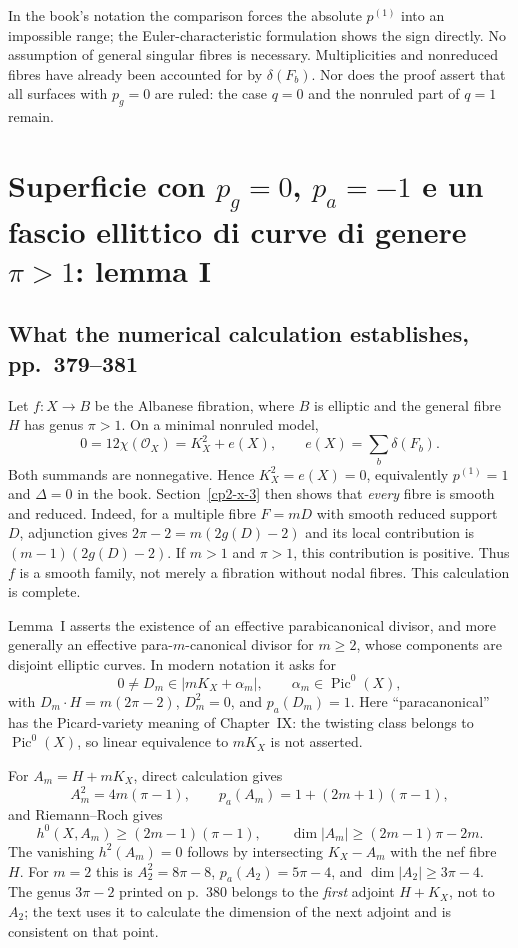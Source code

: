 In the book's notation the comparison forces the absolute $p^{(1)}$ into an impossible range; the Euler-characteristic formulation shows the sign directly. No assumption of general singular fibres is necessary. Multiplicities and nonreduced fibres have already been accounted for by $\delta(F_b)$. Nor does the proof assert that all surfaces with $p_g=0$ are ruled: the case $q=0$ and the nonruled part of $q=1$ remain.

\section{Superficie con \texorpdfstring{$p_g=0$}{pg=0}, \texorpdfstring{$p_a=-1$}{pa=−1} e un fascio ellittico di curve di genere \texorpdfstring{$\pi>1$}{π>1}: lemma I}
\label{cp2-x-5}

\subsection{What the numerical calculation establishes, pp.~379--381}

Let $f:X\to B$ be the Albanese fibration, where $B$ is elliptic and the general fibre $H$ has genus $\pi>1$. On a minimal nonruled model,
\[
 0=12\chi(\mathcal O_X)=K_X^2+e(X),\qquad
 e(X)=\sum_b\delta(F_b).
\]
Both summands are nonnegative. Hence $K_X^2=e(X)=0$, equivalently $p^{(1)}=1$ and $\Delta=0$ in the book. Section~\ref{cp2-x-3} then shows that \emph{every} fibre is smooth and reduced. Indeed, for a multiple fibre $F=mD$ with smooth reduced support $D$, adjunction gives $2\pi-2=m(2g(D)-2)$ and its local contribution is $(m-1)(2g(D)-2)$. If $m>1$ and $\pi>1$, this contribution is positive. Thus $f$ is a smooth family, not merely a fibration without nodal fibres. This calculation is complete.

Lemma~I asserts the existence of an effective parabicanonical divisor, and more generally an effective para-$m$-canonical divisor for $m\geq2$, whose components are disjoint elliptic curves. In modern notation it asks for
\[
 0\ne D_m\in|mK_X+\alpha_m|,
 \qquad\alpha_m\in\operatorname{Pic}^0(X),
\]
with $D_m\cdot H=m(2\pi-2)$, $D_m^2=0$, and $p_a(D_m)=1$. Here ``paracanonical'' has the Picard-variety meaning of Chapter~IX: the twisting class belongs to $\operatorname{Pic}^0(X)$, so linear equivalence to $mK_X$ is not asserted.

For $A_m=H+mK_X$, direct calculation gives
\[
 A_m^2=4m(\pi-1),\qquad
 p_a(A_m)=1+(2m+1)(\pi-1),
\]
and Riemann--Roch gives
\[
 h^0(X,A_m)\geq(2m-1)(\pi-1),\qquad
 \dim|A_m|\geq(2m-1)\pi-2m.
\]
The vanishing $h^2(A_m)=0$ follows by intersecting $K_X-A_m$ with the nef fibre $H$. For $m=2$ this is $A_2^2=8\pi-8$, $p_a(A_2)=5\pi-4$, and $\dim|A_2|\geq3\pi-4$. The genus $3\pi-2$ printed on p.~380 belongs to the \emph{first} adjoint $H+K_X$, not to $A_2$; the text uses it to calculate the dimension of the next adjoint and is consistent on that point.

